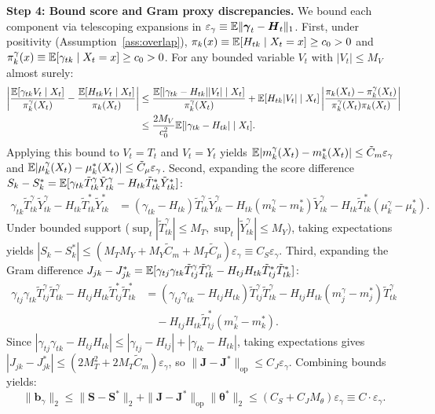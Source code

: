 \textbf{Step 4: Bound score and Gram proxy discrepancies.}
We bound each component via telescoping expansions in $\varepsilon_\gamma \equiv \mathbb{E}\|\boldsymbol{\gamma}_t - \boldsymbol{H}_t\|_1$.
First, under positivity (Assumption~\ref{ass:overlap}), $\pi_k(x) \equiv \mathbb{E}[H_{tk} \mid X_t=x] \ge c_0 > 0$ and $\pi_k^\gamma(x) \equiv \mathbb{E}[\gamma_{tk} \mid X_t=x] \ge c_0 > 0$. For any bounded variable $V_t$ with $|V_t| \le M_V$ almost surely:
\begin{align}
    \left| \frac{\mathbb{E}[\gamma_{tk} V_t \mid X_t]}{\pi_k^\gamma(X_t)} - \frac{\mathbb{E}[H_{tk} V_t \mid X_t]}{\pi_k(X_t)} \right| 
    &\le \frac{\mathbb{E}[|\gamma_{tk} - H_{tk}| |V_t| \mid X_t]}{\pi_k^\gamma(X_t)} + \mathbb{E}[H_{tk}|V_t| \mid X_t] \left| \frac{\pi_k(X_t) - \pi_k^\gamma(X_t)}{\pi_k^\gamma(X_t) \pi_k(X_t)} \right| \nonumber \\
    &\le \frac{2 M_V}{c_0^2} \mathbb{E}[|\gamma_{tk} - H_{tk}| \mid X_t].
\end{align}
Applying this bound to $V_t = T_t$ and $V_t = Y_t$ yields $\mathbb{E}|m_k^\gamma(X_t) - m_k^*(X_t)| \le \tilde{C}_m \varepsilon_\gamma$ and $\mathbb{E}|\mu_k^\gamma(X_t) - \mu_k^*(X_t)| \le \tilde{C}_\mu \varepsilon_\gamma$.
Second, expanding the score difference $S_k - S_k^* = \mathbb{E}[\gamma_{tk} \tilde{T}_{tk}^\gamma \tilde{Y}_{tk}^\gamma - H_{tk} \tilde{T}_{tk}^* \tilde{Y}_{tk}^*]$:
\begin{align}
    \gamma_{tk} \tilde{T}_{tk}^\gamma \tilde{Y}_{tk}^\gamma - H_{tk} \tilde{T}_{tk}^* \tilde{Y}_{tk}^* &= (\gamma_{tk} - H_{tk}) \tilde{T}_{tk}^\gamma \tilde{Y}_{tk}^\gamma - H_{tk} (m_k^\gamma - m_k^*) \tilde{Y}_{tk}^\gamma - H_{tk} \tilde{T}_{tk}^* (\mu_k^\gamma - \mu_k^*).
\end{align}
Under bounded support ($\sup_t |\tilde{T}_{tk}^\gamma| \le M_T, \sup_t |\tilde{Y}_{tk}^\gamma| \le M_Y$), taking expectations yields $|S_k - S_k^*| \le (M_T M_Y + M_Y \tilde{C}_m + M_T \tilde{C}_\mu) \varepsilon_\gamma \equiv C_S \varepsilon_\gamma$.
Third, expanding the Gram difference $J_{jk} - J_{jk}^* = \mathbb{E}[\gamma_{tj}\gamma_{tk} \tilde{T}_{tj}^\gamma \tilde{T}_{tk}^\gamma - H_{tj}H_{tk} \tilde{T}_{tj}^* \tilde{T}_{tk}^*]$:
\begin{align}
    \gamma_{tj}\gamma_{tk} \tilde{T}_{tj}^\gamma \tilde{T}_{tk}^\gamma - H_{tj}H_{tk} \tilde{T}_{tj}^* \tilde{T}_{tk}^* &= (\gamma_{tj}\gamma_{tk} - H_{tj}H_{tk}) \tilde{T}_{tj}^\gamma \tilde{T}_{tk}^\gamma - H_{tj}H_{tk} (m_j^\gamma - m_j^*) \tilde{T}_{tk}^\gamma \nonumber \\
    &\quad - H_{tj}H_{tk} \tilde{T}_{tj}^* (m_k^\gamma - m_k^*).
\end{align}
Since $|\gamma_{tj}\gamma_{tk} - H_{tj}H_{tk}| \le |\gamma_{tj} - H_{tj}| + |\gamma_{tk} - H_{tk}|$, taking expectations gives $|J_{jk} - J_{jk}^*| \le (2 M_T^2 + 2 M_T \tilde{C}_m) \varepsilon_\gamma$, so $\|\boldsymbol{J} - \boldsymbol{J}^*\|_{\mathrm{op}} \le C_J \varepsilon_\gamma$.
Combining bounds yields:
\begin{equation}
    \|\boldsymbol{b}_\gamma\|_2 \le \|\boldsymbol{S} - \boldsymbol{S}^*\|_2 + \|\boldsymbol{J} - \boldsymbol{J}^*\|_{\mathrm{op}} \|\boldsymbol{\theta}^*\|_2 \le (C_S + C_J M_\theta) \varepsilon_\gamma \equiv C \cdot \varepsilon_\gamma.
\end{equation}

